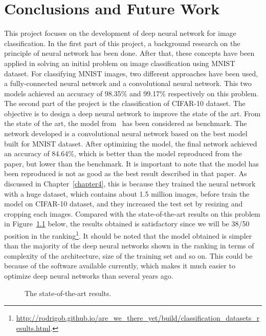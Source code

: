 \documentclass[]{UCD_CS_FYP_Report}
\begin{document}
\chapter{\label{chapter6}Conclusions and Future Work}
This project focuses on the development of deep neural network for image classification. In the first part of this project, a background research on the principle of neural network has been done. After that, these concepts have been applied in solving an initial problem on image classification using MNIST dataset. For classifying MNIST images, two different approaches have been used, a fully-connected neural network and a convolutional neural network. This two models achieved an accuracy of 98.35\% and 99.17\% respectively on this problem. The second part of the project is the classification of CIFAR-10 dataset. The objective is to design a deep neural network to improve the state of the art. From the state of the art, the model from~\cite{Lars:2015} has been considered as benchmark. The network developed is a convolutional neural network based on the best model built for MNIST dataset. After optimizing the model, the final network achieved an accuracy of 84.64\%, which is better than the model reproduced from the paper, but lower than the benchmark. It is important to note that the model has been reproduced is not as good as the best result described in that paper. As discussed in Chapter~\ref{chapter4}, this is because they trained the neural network with a huge dataset, which contains about 1.5 million images, before train the model on CIFAR-10 dataset, and they increased the test set by resizing and cropping each images.
Compared with the state-of-the-art results on this problem in Figure~\ref{fig:state_of_the_art_approaches} below, the results obtained is satisfactory since we will be 38/50 position in the ranking\footnote{\url{http://rodrigob.github.io/are_we_there_yet/build/classification_datasets_results.html}.}. It should be noted that the model obtained is simpler than the majority of the deep neural networks shown in the ranking in terms of complexity of the architecture, size of the training set and so on. This could be because of the software available currently, which makes it much easier to optimize deep neural networks than several years ago.
\begin{figure}[h]
\centering
\fboxsep 2mm
\caption{\label{fig:state_of_the_art_approaches} The state-of-the-art results.}
\end{figure}
\end{document}
